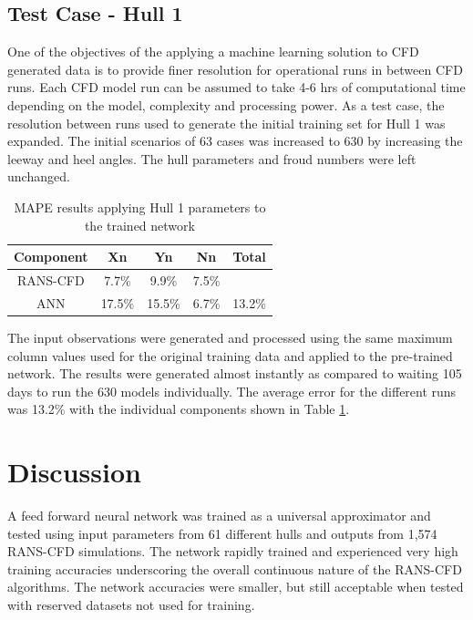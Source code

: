 \documentclass[twoside,twocolumn]{article}
\begin{document}
\subsection{Test Case - Hull 1}
One of the objectives of the applying a machine learning solution to CFD generated data is to provide finer resolution for operational runs in between CFD runs. Each CFD model run can be assumed to take 4-6 hrs of computational time depending on the model, complexity and processing power. As a test case, the resolution between runs used to generate the initial training set for Hull 1 was expanded. The initial scenarios of 63 cases was increased to 630 by increasing the leeway and heel angles. The hull parameters and froud numbers were left unchanged. 

\begin{table}[]
\centering
\caption{MAPE results applying Hull 1 parameters to the trained network}
\label{tab:hull1_results}
\begin{tabular}{@{}ccccc@{}}
	\toprule
	\textbf{Component} & \textbf{Xn} & \textbf{Yn} & \textbf{Nn} & \textbf{Total} \\ \midrule
	RANS-CFD & 7.7\% & 9.9\% & 7.5\% \\
	ANN & 17.5\% & 15.5\% & 6.7\% & 13.2\% \\ \bottomrule
\end{tabular}
\end{table}

The input observations were generated and processed using the same maximum column values used for the original training data and applied to the pre-trained network. The results were generated almost instantly as compared to waiting 105 days to run the 630 models individually. The average error for the different runs was 13.2\% with the individual components shown in Table \ref{tab:hull1_results}.



\section{Discussion}

A feed forward neural network was trained as a universal approximator and tested using input parameters from 61 different hulls and outputs from 1,574 RANS-CFD simulations. The network rapidly trained and experienced very high training accuracies underscoring the overall continuous nature of the RANS-CFD algorithms. The network accuracies were smaller, but still acceptable when tested with reserved datasets not used for training.
\end{document}
